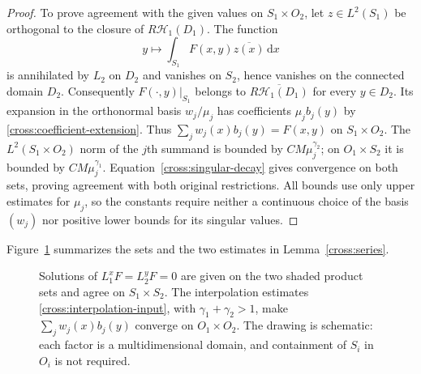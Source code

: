 \documentclass[11pt,a4paper]{article}
\theoremstyle{definition}
\theoremstyle{remark}
\newcommand{\dd}{\mathrm d}
\numberwithin{equation}{section}
\begin{document}
\begin{proof}
To prove agreement with the given values on $S_1\times O_2$,
let $z\in L^2(S_1)$ be orthogonal to the closure of
$R\mathcal H_1(D_1)$. The function
\[
 y\longmapsto\int_{S_1}F(x,y)\overline{z(x)}\,\dd x
\]
is annihilated by $L_2$ on $D_2$ and vanishes on $S_2$, hence vanishes
on the connected domain $D_2$. Consequently
$F(\cdot,y)|_{S_1}$ belongs to
$\overline{R\mathcal H_1(D_1)}$ for every $y\in D_2$.
Its expansion in the orthonormal basis $w_j/\mu_j$ has coefficients
$\mu_jb_j(y)$ by \eqref{cross:coefficient-extension}. Thus
$\sum_j w_j(x)b_j(y)=F(x,y)$ on $S_1\times O_2$.
The $L^2(S_1\times O_2)$ norm of the $j$th summand is bounded by
$CM\mu_j^{\gamma_2}$; on $O_1\times S_2$ it is bounded by
$CM\mu_j^{\gamma_1}$. Equation~\eqref{cross:singular-decay} gives
convergence on both sets, proving agreement with both original
restrictions. All bounds use only upper estimates for $\mu_j$,
so the constants require neither a continuous choice of the basis
$(w_j)$ nor positive lower bounds for its singular values.
\end{proof}

Figure~\ref{cross:figure} summarizes the sets and the two estimates in
Lemma~\ref{cross:series}.
\begin{figure}[htbp]
 \centering
{}
 \caption{Solutions of $L_1^xF=L_2^yF=0$ are given on the two
 shaded product sets and agree on $S_1\times S_2$.
 The interpolation estimates \eqref{cross:interpolation-input},
 with $\gamma_1+\gamma_2>1$, make $\sum_jw_j(x)b_j(y)$ converge
 on $O_1\times O_2$.
 The drawing is schematic: each factor is a multidimensional domain,
 and containment of $S_i$ in $O_i$ is not required.}
 \label{cross:figure}
\end{figure}
\end{document}

